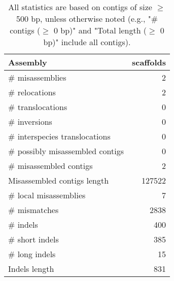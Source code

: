 \documentclass[12pt,a4paper]{article}
\begin{document}
\begin{table}[ht]
\begin{center}
\caption{All statistics are based on contigs of size $\geq$ 500 bp, unless otherwise noted (e.g., "\# contigs ($\geq$ 0 bp)" and "Total length ($\geq$ 0 bp)" include all contigs).}
\begin{tabular}{|l*{1}{|r}|}
\hline
Assembly & scaffolds \\ \hline
\# misassemblies & 2 \\ \hline
\hspace{5mm}\# relocations & 2 \\ \hline
\hspace{5mm}\# translocations & 0 \\ \hline
\hspace{5mm}\# inversions & 0 \\ \hline
\hspace{5mm}\# interspecies translocations & 0 \\ \hline
\# possibly misassembled contigs & 0 \\ \hline
\# misassembled contigs & 2 \\ \hline
Misassembled contigs length & 127522 \\ \hline
\# local misassemblies & 7 \\ \hline
\# mismatches & 2838 \\ \hline
\# indels & 400 \\ \hline
\hspace{5mm}\# short indels & 385 \\ \hline
\hspace{5mm}\# long indels & 15 \\ \hline
Indels length & 831 \\ \hline
\end{tabular}
\end{center}
\end{table}
\end{document}
